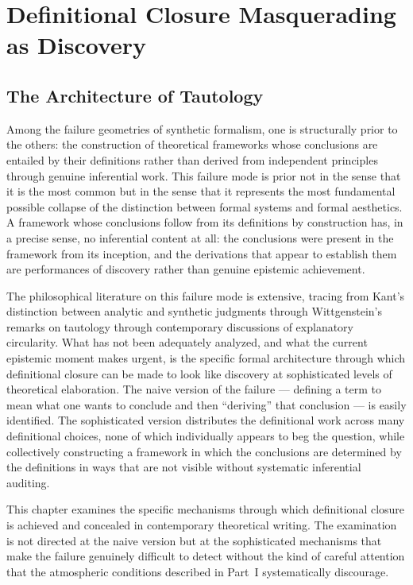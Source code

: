 \documentclass[12pt, openright, twoside]{book}
\begin{document}
\clearpage

\chapter{Definitional Closure Masquerading as Discovery}

\section{The Architecture of Tautology}

Among the failure geometries of synthetic formalism, one is
structurally prior to the others: the construction of theoretical
frameworks whose conclusions are entailed by their definitions
rather than derived from independent principles through genuine
inferential work. This failure mode is prior not in the sense
that it is the most common but in the sense that it represents
the most fundamental possible collapse of the distinction between
formal systems and formal aesthetics. A framework whose conclusions
follow from its definitions by construction has, in a precise
sense, no inferential content at all: the conclusions were
present in the framework from its inception, and the derivations
that appear to establish them are performances of discovery
rather than genuine epistemic achievement.

The philosophical literature on this failure mode is extensive,
tracing from Kant's distinction between analytic and synthetic
judgments through Wittgenstein's remarks on tautology through
contemporary discussions of explanatory circularity. What has
not been adequately analyzed, and what the current epistemic
moment makes urgent, is the specific formal architecture through
which definitional closure can be made to look like discovery
at sophisticated levels of theoretical elaboration. The naive
version of the failure --- defining a term to mean what one
wants to conclude and then ``deriving'' that conclusion ---
is easily identified. The sophisticated version distributes
the definitional work across many definitional choices,
none of which individually appears to beg the question, while
collectively constructing a framework in which the conclusions
are determined by the definitions in ways that are not visible
without systematic inferential auditing.

This chapter examines the specific mechanisms through which
definitional closure is achieved and concealed in contemporary
theoretical writing. The examination is not directed at the
naive version but at the sophisticated mechanisms that make
the failure genuinely difficult to detect without the kind of
careful attention that the atmospheric conditions described
in Part~I systematically discourage.
\end{document}
